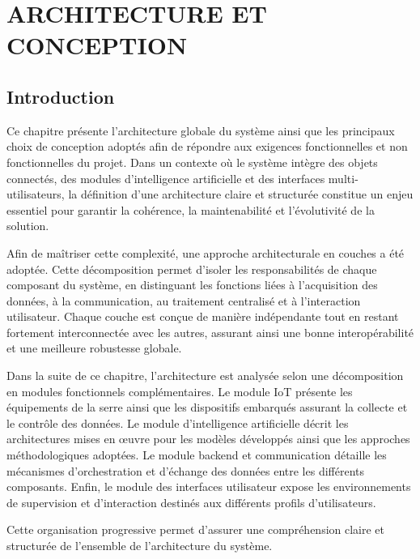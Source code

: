 \chapter{ARCHITECTURE ET CONCEPTION}

\section*{Introduction}

Ce chapitre présente l’architecture globale du système ainsi que les principaux choix de conception adoptés afin de répondre aux exigences fonctionnelles et non fonctionnelles du projet. Dans un contexte où le système intègre des objets connectés, des modules d’intelligence artificielle et des interfaces multi-utilisateurs, la définition d’une architecture claire et structurée constitue un enjeu essentiel pour garantir la cohérence, la maintenabilité et l’évolutivité de la solution.

Afin de maîtriser cette complexité, une approche architecturale en couches a été adoptée. Cette décomposition permet d’isoler les responsabilités de chaque composant du système, en distinguant les fonctions liées à l’acquisition des données, à la communication, au traitement centralisé et à l’interaction utilisateur. Chaque couche est conçue de manière indépendante tout en restant fortement interconnectée avec les autres, assurant ainsi une bonne interopérabilité et une meilleure robustesse globale.

Dans la suite de ce chapitre, l’architecture est analysée selon une décomposition en modules fonctionnels complémentaires. Le module IoT présente les équipements de la serre ainsi que les dispositifs embarqués assurant la collecte et le contrôle des données. Le module d’intelligence artificielle décrit les architectures mises en œuvre pour les modèles développés ainsi que les approches méthodologiques adoptées. Le module backend et communication détaille les mécanismes d’orchestration et d’échange des données entre les différents composants. Enfin, le module des interfaces utilisateur expose les environnements de supervision et d’interaction destinés aux différents profils d’utilisateurs.

Cette organisation progressive permet d’assurer une compréhension claire et structurée de l’ensemble de l’architecture du système.
\newpage
